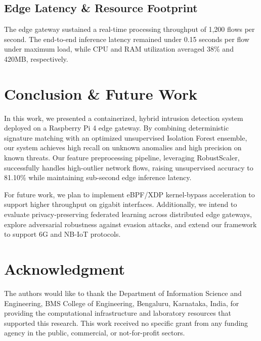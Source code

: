\documentclass[journal]{IEEEtran}
\begin{document}
\subsection{Edge Latency & Resource Footprint}
The edge gateway sustained a real-time processing throughput of 1,200 flows per second. The end-to-end inference latency remained under 0.15 seconds per flow under maximum load, while CPU and RAM utilization averaged 38\% and 420MB, respectively.

\section{Conclusion & Future Work}
In this work, we presented a containerized, hybrid intrusion detection system deployed on a Raspberry Pi 4 edge gateway. By combining deterministic signature matching with an optimized unsupervised Isolation Forest ensemble, our system achieves high recall on unknown anomalies and high precision on known threats. Our feature preprocessing pipeline, leveraging RobustScaler, successfully handles high-outlier network flows, raising unsupervised accuracy to 81.10\% while maintaining sub-second edge inference latency.

For future work, we plan to implement eBPF/XDP kernel-bypass acceleration to support higher throughput on gigabit interfaces. Additionally, we intend to evaluate privacy-preserving federated learning across distributed edge gateways, explore adversarial robustness against evasion attacks, and extend our framework to support 6G and NB-IoT protocols.

\section*{Acknowledgment}
The authors would like to thank the Department of Information Science and Engineering, BMS College of Engineering, Bengaluru, Karnataka, India, for providing the computational infrastructure and laboratory resources that supported this research. This work received no specific grant from any funding agency in the public, commercial, or not-for-profit sectors.
\end{document}
